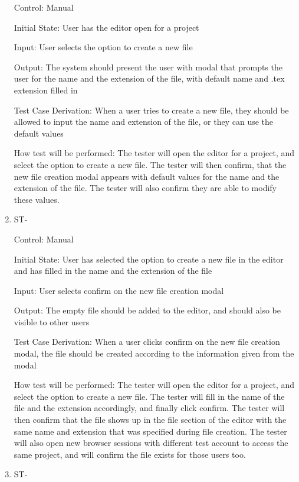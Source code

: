 \documentclass[12pt, titlepage]{article}
\newcounter{TESTID}
\newcommand\TESTNUM{\stepcounter{TESTID}\theTESTID}
\begin{document}
\begin{enumerate}
		Control: Manual
		
		Initial State: User has the editor open for a project
		
		Input: User selects the option to create a new file
		
		Output: The system should present the user with modal that prompts the user for the name and the extension of the file, with default name and .tex extension filled in
		
		Test Case Derivation: When a user tries to create a new file, they should be allowed to input the name and extension of the file, or they can use the default values
		
		How test will be performed: The tester will open the editor for a project, and select the option to create a new file. The tester will then confirm, that the new file creation modal appears with default values for the name and the extension of the file. The tester will also confirm they are able to modify these values.
		
		\item{ST-\TESTNUM\\}
		
		Control: Manual
		
		Initial State: User has selected the option to create a new file in the editor and has filled in the name and the extension of the file
		
		Input: User selects confirm on the new file creation modal
		
		Output: The empty file should be added to the editor, and should also be visible to other users
		
		Test Case Derivation: When a user clicks confirm on the new file creation modal, the file should be created according to the information given from the modal
		
		How test will be performed: The tester will open the editor for a project, and select the option to create a new file. The tester will fill in the name of the file and the extension accordingly, and finally click confirm. The tester will then confirm that the file shows up in the file section of the editor with the same name and extension that was specified during file creation. The tester will also open new browser sessions with different test account to access the same project, and will confirm the file exists for those users too.
		
		\item{ST-\TESTNUM\\}
		

\end{enumerate}
\end{document}
